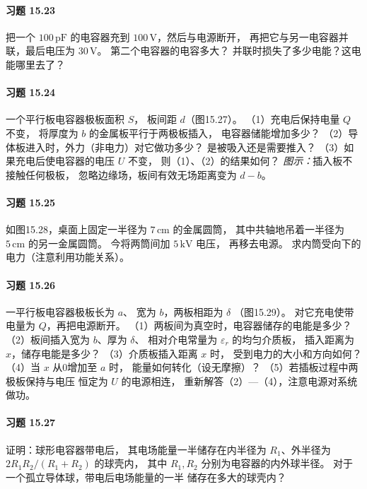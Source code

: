 \paragraph{习题 15.23}
把一个 \(100\,\mathrm{pF}\) 的电容器充到
\(100\,\mathrm V\)，然后与电源断开，
再把它与另一电容器并联，最后电压为
\(30\,\mathrm V\)。
第二个电容器的电容多大？
并联时损失了多少电能？这电能哪里去了？

\paragraph{习题 15.24}
一个平行板电容器极板面积 \(S\)，
板间距 \(d\)（图15.27）。
（1）充电后保持电量 \(Q\) 不变，
将厚度为 \(b\) 的金属板平行于两极板插入，
电容器储能增加多少？
（2）导体板进入时，外力（非电力）对它做功多少？
是被吸入还是需要推入？
（3）如果充电后使电容器的电压 \(U\) 不变，
则（1）、（2）的结果如何？
\textit{图示：}插入板不接触任何极板，
忽略边缘场，板间有效无场距离变为 \(d-b\)。

\paragraph{习题 15.25}
如图15.28，桌面上固定一半径为
\(7\,\mathrm{cm}\) 的金属圆筒，
其中共轴地吊着一半径为
\(5\,\mathrm{cm}\) 的另一金属圆筒。
今将两筒间加 \(5\,\mathrm{kV}\) 电压，
再移去电源。
求内筒受向下的电力（注意利用功能关系）。

\paragraph{习题 15.26}
一平行板电容器极板长为 \(a\)、
宽为 \(b\)，两板相距为 \(\delta\)
（图15.29）。
对它充电使带电量为 \(Q\)，再把电源断开。
（1）两板间为真空时，电容器储存的电能是多少？
（2）板间插入宽为 \(b\)、厚为 \(\delta\)、
相对介电常量为 \(\varepsilon_r\) 的均匀介质板，
插入距离为 \(x\)，储存电能是多少？
（3）介质板插入距离 \(x\) 时，
受到电力的大小和方向如何？
（4）当 \(x\) 从0增加至 \(a\) 时，
能量如何转化（设无摩擦）？
（5）若插板过程中两极板保持与电压
恒定为 \(U\) 的电源相连，
重新解答（2）—（4），注意电源对系统做功。

\paragraph{习题 15.27}
证明：球形电容器带电后，
其电场能量一半储存在内半径为
\(R_1\)、外半径为
\(2R_1R_2/(R_1+R_2)\) 的球壳内，
其中 \(R_1,R_2\) 分别为电容器的内外球半径。
对于一个孤立导体球，带电后电场能量的一半
储存在多大的球壳内？

